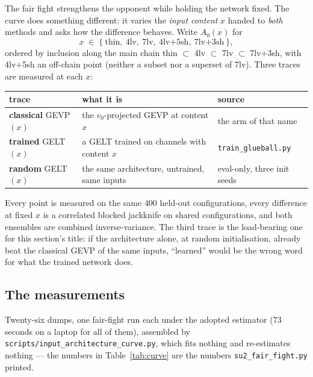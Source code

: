 \documentclass[11pt,a4paper]{article}
\newcommand{\Azero}{A_0}
\begin{document}
The fair fight strengthens the opponent while holding the network fixed. The
curve does something different: it varies the \emph{input content} $x$ handed to
\emph{both} methods and asks how the difference behaves. Write $\Azero(x)$ for
\begin{equation}
  x \;\in\; \{\ \text{thin},\ \text{4lv},\ \text{7lv},\ \text{4lv+5sh},\
  \text{7lv+3sh}\ \},
\end{equation}
ordered by inclusion along the main chain thin $\subset$ 4lv $\subset$ 7lv
$\subset$ 7lv+3sh, with 4lv+5sh an off-chain point (neither a subset nor a
superset of 7lv). Three traces are measured at each $x$:

\begin{center}\small
\setlength{\tabcolsep}{4pt}
\begin{tabular}{@{}lll@{}}
\toprule
trace & what it is & source \\
\midrule
\textbf{classical} GEVP$(x)$ & the $v_0$-projected GEVP at content $x$
  & the arm of that name \\
\textbf{trained} GELT$(x)$ & a GELT trained on channels with content $x$
  & \texttt{train\_glueball.py} \\
\textbf{random} GELT$(x)$ & the same architecture, untrained, same inputs
  & eval-only, three init seeds \\
\bottomrule
\end{tabular}
\end{center}

Every point is measured on the same $400$ held-out configurations, every
difference at fixed $x$ is a correlated blocked jackknife on shared
configurations, and both ensembles are combined inverse-variance. The third
trace is the load-bearing one for this section's title: if the architecture
alone, at random initialisation, already beat the classical GEVP of the same
inputs, ``learned'' would be the wrong word for what the trained network does.

\subsection{The measurements}
\label{sec:curvetable}

Twenty-six dumps, one fair-fight run each under the adopted estimator ($73$
seconds on a laptop for all of them), assembled by
\texttt{scripts/input\_architecture\_curve.py}, which fits nothing and
re-estimates nothing --- the numbers in Table~\ref{tab:curve} are the numbers
\texttt{su2\_fair\_fight.py} printed.
\end{document}
